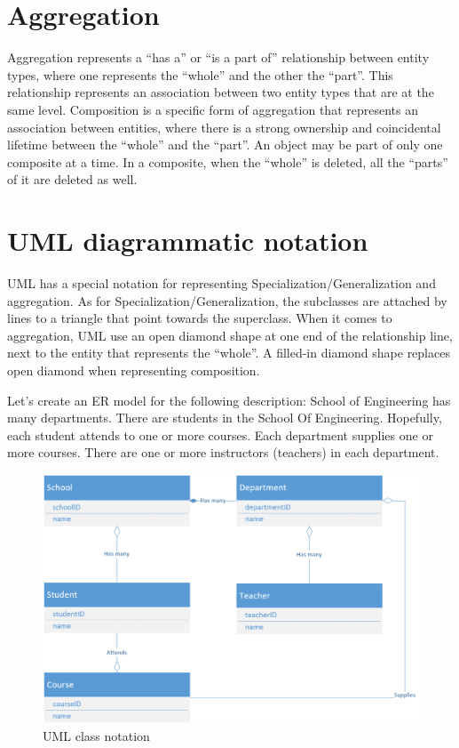 \documentclass[]{article}
\begin{document}
\section{Aggregation}
Aggregation represents a ``has a'' or ``is a part of'' relationship between entity types, where one represents the ``whole'' and the other the ``part''. This relationship represents an association between two entity types that are at the same level. Composition is a specific form of aggregation that represents an association between entities, where there is a strong ownership and coincidental lifetime between the ``whole'' and the ``part''. An object may be part of only one composite at a time. In a composite, when the ``whole'' is deleted, all the ``parts'' of it are deleted as well.
\section{UML diagrammatic notation}
UML has a special notation for representing Specialization/Generalization and aggregation. As for Specialization/Generalization, the subclasses are attached by lines to a triangle that point towards the superclass. When it comes to aggregation, UML use an open diamond shape at one end of the relationship line, next to the entity that represents the ``whole''. A filled-in diamond shape replaces open diamond when representing composition.\par 
Let's create an ER model for the following description:
School of Engineering has many departments. There are students in the
School Of Engineering. Hopefully, each student attends to one or more
courses. Each department supplies one or more courses. There are one or
more instructors (teachers) in each department.
\begin{figure}[hbtp]
\caption{UML class notation}
\centering
\includegraphics[width=\textwidth]{Capture.PNG}
\end{figure}
\end{document}
